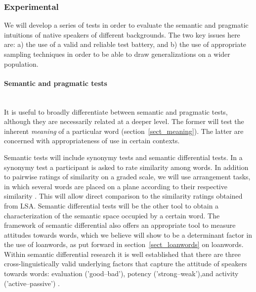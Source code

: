 \documentclass[a4paper]{article}
\begin{document}
\subsubsection{Experimental}
\label{subsect_experim}

We will develop a series of tests in order to evaluate the semantic and pragmatic intuitions of native speakers of different backgrounds.
The two key issues here are: a) the use of a valid and reliable test battery, and b) the use of appropriate sampling techniques in order to be able to draw generalizations on a wider population.

\paragraph{ Semantic and pragmatic tests}
\hspace{0pt} \\
It is useful to broadly differentiate between semantic and pragmatic tests, although they are necessarily related at a deeper level.
The former will test the inherent \emph{meaning} of a particular word (section~\ref{sect_meaning}). 
The latter are concerned with appropriateness of use in certain contexts.

Semantic tests will include synonymy tests and semantic differential tests.
In a synonymy test a participant is asked to rate similarity among words.
In addition to pairwise ratings of similarity on a graded scale, we will use arrangement tasks, in which several words are placed on a plane according to their respective similarity \citep{Goldstone1994, Kriegeskorte2012}.
This will allow direct comparison to the similarity ratings obtained from LSA.
Semantic differential tests \citep{Osgood1957} will be the other tool to obtain a characterization of the semantic space occupied by a certain word.
The framework of semantic differential also offers an appropriate tool to measure attitudes towards words, which we believe will show to be a determinant factor in the use of loanwords, as put forward in section~\ref{sect_loanwords} on loanwords.
Within semantic differential research it is well established that there are three cross-linguistically valid underlying factors that capture the attitude of speakers towards words: evaluation ('good--bad'), potency ('strong--weak'),and activity ('active--passive') \citep[see][]{Heise2010}.
\end{document}
